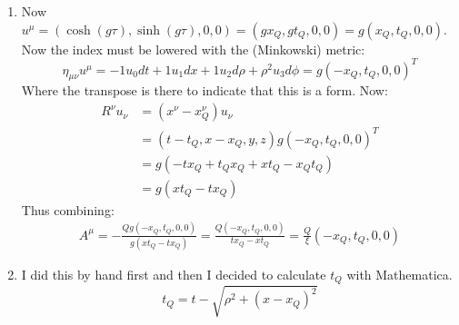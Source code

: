 \documentclass[12pt,a4]{article}
\begin{document}
\begin{enumerate}
\begin{enumerate}
\begin{align*}
        \end{align*}
        Now $(x_Q'^\mu - x'^\mu)(x'\tensor{}{_Q_\mu} - x'_\mu)$ is implicitly a function of $\tau$, therefore using Equation~\ref{eq:diracdeltafunction}:
        \begin{align*}
          \delta((x_Q'^\mu - x'^\mu)(x'\tensor{}{_Q_\mu} - x'_\mu)) = \frac{\delta(\tau - \tau')}{|(x_Q'^\mu - x'^\mu)\partial_\tau x'\tensor{}{_Q_\mu} + (x_Q'^\mu - x'_\mu)\partial_\tau x_Q'^\mu|} = \frac{\delta(\tau - \tau')}{2|(x'^\mu - x_Q'^\mu)u_\mu|}
        \end{align*}
        And using this in the expression for $A^\mu$ and carrying out the $\tau '$ integral over the delta function:
        \begin{align*}
          A^\mu &=\frac{1}{4 \pi}Q \frac{u^\mu}{|(x'^\nu - x_Q'^\nu)u_\nu|}
        \end{align*}
        Choosing units that set $4 \pi = 1$ gives the desired relation.
      \item
        Now $u^\mu = (\cosh(g \tau), \sinh(g \tau), 0, 0) = (g x_Q, g t_Q, 0, 0) = g(x_Q,t_Q, 0, 0)$. 
        Now the index must be lowered with the (Minkowski) metric:
        \begin{equation*}
          \eta_{\mu\nu} u^\mu = -1 u_0 dt + 1 u_1 dx + 1 u_2 d\rho + \rho^2 u_3 d\phi = g(-x_Q,t_Q, 0, 0)^{T}
        \end{equation*}
        Where the transpose is there to indicate that this is a form.
        Now:
        \begin{align*}
          R^\nu u_\nu &= (x^\nu - x_Q^\nu)u_\nu\\
                      &= (t - t_Q, x - x_Q, y, z) g (-x_Q, t_Q, 0, 0)^T\\
                      &= g(-t x_Q + t_Qx_Q +x t_Q - x_Qt_Q)\\
                      &= g(x t_Q -t x_Q)
        \end{align*}
        Thus combining:
        \begin{align*}
          A^\mu = - \frac{Q g (-x_Q, t_Q, 0, 0)}{g(x t_Q -t x_Q)} = \frac{Q  (-x_Q, t_Q, 0, 0)}{t x_Q - x t_Q} = \frac{Q}{\xi} (-x_Q, t_Q, 0, 0)
        \end{align*}
      \item
        I did this by hand first and then I decided to calculate $t_Q$ with Mathematica.
        \begin{equation*}
          t_Q = t - \sqrt{\rho^2 + (x - x_Q)^2}
        \end{equation*}

\end{enumerate}
\end{enumerate}
\end{document}
